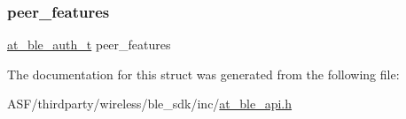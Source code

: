 \subsubsection{\texorpdfstring{peer\_features}{peer\_features}}
{\footnotesize\ttfamily \mbox{\hyperlink{at__ble__api_8h_a70253ec09a2361d16e15c37f8cb5b97c}{at\+\_\+ble\+\_\+auth\+\_\+t}} peer\+\_\+features}



The documentation for this struct was generated from the following file\+:\begin{DoxyCompactItemize}
\item 
A\+S\+F/thirdparty/wireless/ble\+\_\+sdk/inc/\mbox{\hyperlink{at__ble__api_8h}{at\+\_\+ble\+\_\+api.\+h}}\end{DoxyCompactItemize}
